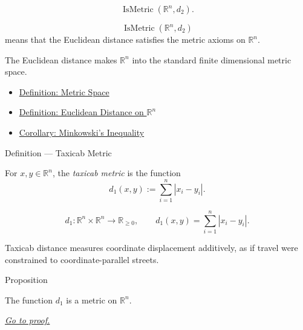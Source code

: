 \begin{remark*}
\[
  \operatorname{IsMetric}(\mathbb{R}^n,d_2).
\]
\end{remark*}

\begin{remark*}
\[
\operatorname{IsMetric}(\mathbb{R}^n,d_2)
\]
means that the Euclidean distance satisfies the metric axioms on
\(\mathbb{R}^n\).
\end{remark*}

\begin{remark*}[Interpretation]
The Euclidean distance makes \(\mathbb{R}^n\) into the standard finite
dimensional metric space.
\end{remark*}

\begin{dependencies}
\begin{itemize}
  \item \hyperref[def:metric-space]{Definition: Metric Space}
  \item \hyperref[def:euclidean-distance-rn]{Definition: Euclidean Distance on \(\mathbb{R}^n\)}
  \item \hyperref[cor:minkowski-inequality-rn]{Corollary: Minkowski's Inequality}
\end{itemize}
\end{dependencies}

\begin{definitionbox}{Definition --- Taxicab Metric}
\begin{definition}\label{def:taxicab-metric-rn}
For \(x,y\in\mathbb{R}^n\), the \emph{taxicab metric} is the function
\[
  d_1(x,y):=\sum_{i=1}^{n}|x_i-y_i|.
\]
\end{definition}
\end{definitionbox}

\begin{remark*}
\[
d_1:\mathbb{R}^n\times\mathbb{R}^n\to\mathbb{R}_{\geq 0},
\qquad
d_1(x,y)=\sum_{i=1}^{n}|x_i-y_i|.
\]
\end{remark*}

\begin{remark*}[Interpretation]
Taxicab distance measures coordinate displacement additively, as if travel
were constrained to coordinate-parallel streets.
\end{remark*}

\DefinitionalRoot

\begin{propositionbox}{Proposition}
\begin{proposition}\label{prop:taxicab-metric-rn}
The function \(d_1\) is a metric on \(\mathbb{R}^n\).

\smallskip
\noindent
\hyperref[prf:taxicab-metric-rn]{\textit{Go to proof.}}
\end{proposition}
\end{propositionbox}


